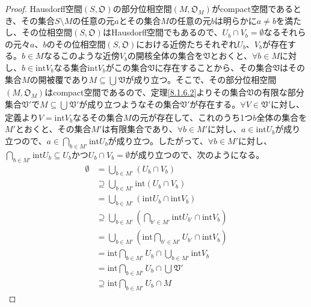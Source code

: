 \documentclass[dvipdfmx]{jsarticle}
\begin{document}
\begin{proof}
Hausdorff空間$\left( S,\mathfrak{O} \right)$の部分位相空間$\left( M,\mathfrak{O}_{M} \right)$がcompact空間であるとき、その集合$S \setminus M$の任意の元$a$とその集合$M$の任意の元$b$は明らかに$a \neq b$を満たし、その位相空間$\left( S,\mathfrak{O} \right)$はHausdorff空間でもあるので、$U_{b} \cap V_{b} = \emptyset$なるそれらの元々$a$、$b$のその位相空間$\left( S,\mathfrak{O} \right)$における近傍たちそれぞれ$U_{b}$、$V_{b}$が存在する。$b \in M$なるこのような近傍$V_{b}$の開核全体の集合を$\mathfrak{V}$とおくと、$\forall b \in M$に対し、$b \in {\mathrm{int}}V_{b}$なる集合${\mathrm{int}}V_{b}$がこの集合$\mathfrak{V}$に存在することから、その集合$\mathfrak{V}$はその集合$M$の開被覆であり$M \subseteq \bigcup_{} \mathfrak{V}$が成り立つ。そこで、その部分位相空間$\left( M,\mathfrak{O}_{M} \right)$はcompact空間であるので、定理\ref{8.1.6.2}よりその集合$\mathfrak{V}$の有限な部分集合$\mathfrak{V}'$で$M \subseteq \bigcup_{} \mathfrak{V}'$が成り立つようなその集合$\mathfrak{V}'$が存在する。$\forall V \in \mathfrak{V}'$に対し、定義より$V = {\mathrm{int}}V_{b}$なるその集合$M$の元が存在して、これのうち1つ$b$全体の集合を$M'$とおくと、その集合$M'$は有限集合であり、$\forall b \in M'$に対し、$a \in {\mathrm{int}}U_{b}$が成り立つので、$a \in \bigcap_{b \in M'} {{\mathrm{int}}U_{b}}$が成り立つ。したがって、$\forall b \in M'$に対し、$\bigcap_{b \in M'} {{\mathrm{int}}U_{b}} \subseteq U_{b}$かつ$U_{b} \cap V_{b} = \emptyset$が成り立つので、次のようになる。
\begin{align*}
\emptyset &= \bigcup_{b \in M'} \left( U_{b} \cap V_{b} \right)\\
&\supseteq \bigcup_{b \in M'} {{\mathrm{int}}\left( U_{b} \cap V_{b} \right)}\\
&= \bigcup_{b \in M'} \left( {\mathrm{int}}U_{b} \cap {\mathrm{int}}V_{b} \right)\\
&\supseteq \bigcup_{b \in M'} \left( \bigcap_{b' \in M'} {{\mathrm{int}}U_{b'}} \cap {\mathrm{int}}V_{b} \right)\\
&= \bigcup_{b \in M'} \left( {\mathrm{int}}{\bigcap_{b' \in M'} U_{b'}} \cap {\mathrm{int}}V_{b} \right)\\
&= {\mathrm{int}}{\bigcap_{b \in M'} U_{b}} \cap \bigcup_{b \in M'} {{\mathrm{int}}V_{b}}\\
&= {\mathrm{int}}{\bigcap_{b \in M'} U_{b}} \cap \bigcup_{} \mathfrak{V}'\\
&\supseteq {\mathrm{int}}{\bigcap_{b \in M'} U_{b}} \cap M
\end{align*}

\end{proof}
\end{document}
